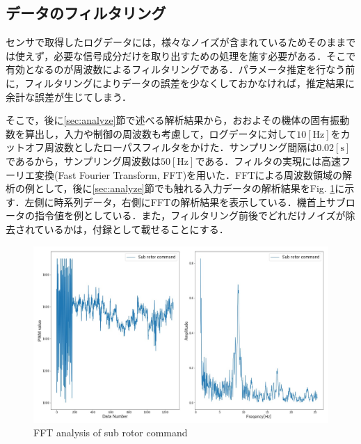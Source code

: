 \subsection{データのフィルタリング}
\label{sec:filter}

センサで取得したログデータには，様々なノイズが含まれているためそのままでは使えず，必要な信号成分だけを取り出すための処理を施す必要がある．そこで有効となるのが周波数によるフィルタリングである．パラメータ推定を行なう前に，フィルタリングによりデータの誤差を少なくしておかなければ，推定結果に余計な誤差が生じてしまう\cite{klein}．

そこで，後に\ref{sec:analyze}節で述べる解析結果から，おおよその機体の固有振動数を算出し，入力や制御の周波数も考慮して，ログデータに対して$10\mathrm{[Hz]}$をカットオフ周波数としたローパスフィルタをかけた．サンプリング間隔は$0.02\mathrm{[s]}$であるから，サンプリング周波数は$50\mathrm{[Hz]}$である．フィルタの実現には高速フーリエ変換(Fast Fourier Transform, FFT)を用いた．FFTによる周波数領域の解析の例として，後に\ref{sec:analyze}節でも触れる入力データの解析結果をFig. \ref{fig:f_input}に示す．左側に時系列データ，右側にFFTの解析結果を表示している．機首上サブロータの指令値を例としている．また，フィルタリング前後でどれだけノイズが除去されているかは，付録として載せることにする．


\begin{figure}[H]
	\centering
	\includegraphics[clip,width=13.0cm,bb=0 0 1440 864]{./z_figure_files/chapter4/sub_input.jpeg}
	\caption{FFT analysis of sub rotor command}
	\label{fig:f_input}
\end{figure}



